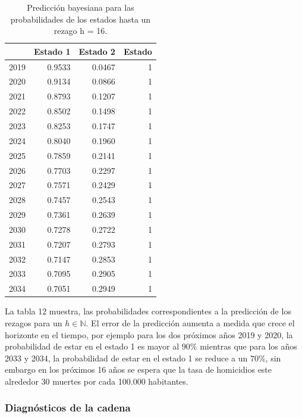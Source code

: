 \documentclass[a4paper]{article}\usepackage[]{graphicx}\usepackage[]{color}
\begin{document}
\begin{table}[ht]
\centering
\begin{tabular}{rrrr}
  \hline
 & Estado 1 & Estado 2 & Estado \\ 
  \hline
2019 & 0.9533 & 0.0467 &     1 \\ 
  2020 & 0.9134 & 0.0866 &     1 \\ 
  2021 & 0.8793 & 0.1207 &     1 \\ 
  2022 & 0.8502 & 0.1498 &     1 \\ 
  2023 & 0.8253 & 0.1747 &     1 \\ 
  2024 & 0.8040 & 0.1960 &     1 \\ 
  2025 & 0.7859 & 0.2141 &     1 \\ 
  2026 & 0.7703 & 0.2297 &     1 \\ 
  2027 & 0.7571 & 0.2429 &     1 \\ 
  2028 & 0.7457 & 0.2543 &     1 \\ 
  2029 & 0.7361 & 0.2639 &     1 \\ 
  2030 & 0.7278 & 0.2722 &     1 \\ 
  2031 & 0.7207 & 0.2793 &     1 \\ 
  2032 & 0.7147 & 0.2853 &     1 \\ 
  2033 & 0.7095 & 0.2905 &     1 \\ 
  2034 & 0.7051 & 0.2949 &     1 \\ 
   \hline
\end{tabular}
\caption{Predicción bayesiana para las probabilidades de los estados hasta un rezago h = 16.} 
\end{table}


La tabla 12 muestra, las probabilidades correspondientes a la predicción de los rezagos para un $h \in \mathbb{N}$. El error de la predicción aumenta a medida que crece el horizonte en el tiempo, por ejemplo para los dos próximos años 2019 y 2020, la probabilidad de estar en el estado 1 es mayor al $90 \%$ mientras que para los años 2033 y 2034, la probabilidad de estar en el estado 1 se reduce a un $70 \%$, sin embargo en los próximos 16 años se espera que la tasa de homicidios este alrededor 30 muertes por cada 100.000 habitantes.

\subsubsection*{Diagnósticos de la cadena}
\end{document}

